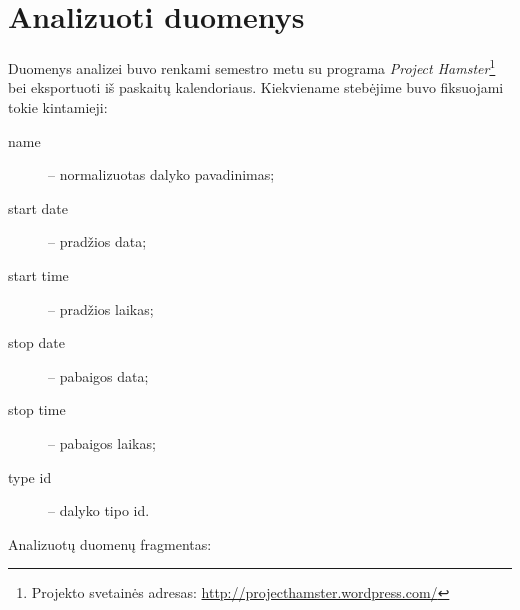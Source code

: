 \chapter{Analizuoti duomenys}

Duomenys analizei buvo renkami semestro metu su programa
\emph{Project Hamster}\footnote{
Projekto svetainės adresas: \url{http://projecthamster.wordpress.com/}}
bei eksportuoti iš paskaitų kalendoriaus. Kiekviename stebėjime buvo
fiksuojami tokie kintamieji:
\begin{description}
  \item[name] – normalizuotas dalyko pavadinimas;
  \item[start date] – pradžios data;
  \item[start time] – pradžios laikas;
  \item[stop date] – pabaigos data;
  \item[stop time] – pabaigos laikas;
  \item[type id] – dalyko tipo id.
\end{description}

Analizuotų duomenų fragmentas:

